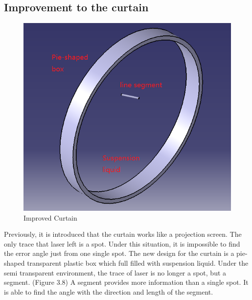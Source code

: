 \documentclass[letterpaper,12pt,oneside]{book}
\begin{document}
		\subsection{Improvement to the curtain}
		\begin{figure}[ht!]
			\begin{center}
				\includegraphics[scale = 0.8]{improvedcurtain.png}
				\caption{Improved Curtain}
			\end{center}
		\end{figure}
		Previously, it is introduced that the curtain works like a projection screen. The only trace that laser left is a spot. Under this situation, it is impossible to find the error angle just from one single spot. The new design for the curtain is a pie-shaped transparent plastic box which full filled with suspension liquid. Under the semi transparent environment, the trace of laser is no longer a spot, but a segment. (Figure 3.8) A segment provides more information than a single spot. It is able to find the angle with the direction and length of the segment.
		
\end{document}
